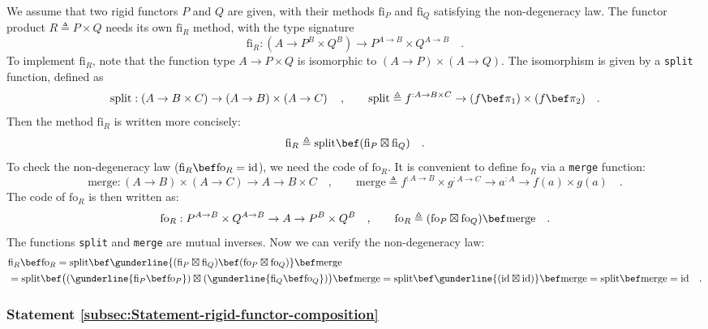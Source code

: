We assume that two rigid functors $P$ and $Q$ are given, with their
methods $\text{fi}_{P}$ and $\text{fi}_{Q}$ satisfying the non-degeneracy
law. The functor product $R\triangleq P\times Q$ needs its own $\text{fi}_{R}$
method, with the type signature
\[
\text{fi}_{R}:(A\rightarrow P^{B}\times Q^{B})\rightarrow P^{A\rightarrow B}\times Q^{A\rightarrow B}\quad.
\]
To implement $\text{fi}_{R}$, note that the function type $A\rightarrow P\times Q$
is isomorphic to $\left(A\rightarrow P\right)\times\left(A\rightarrow Q\right)$.
The isomorphism is given by a \lstinline!split! function, defined
as
\[
\text{split}:\left(A\rightarrow B\times C\right)\rightarrow\left(A\rightarrow B\right)\times\left(A\rightarrow C\right)\quad,\quad\quad\text{split}\triangleq f^{:A\rightarrow B\times C}\rightarrow(f\bef\pi_{1})\times(f\bef\pi_{2})\quad.
\]
Then the method $\text{fi}_{R}$ is written more concisely:
\[
\text{fi}_{R}\triangleq\text{split}\bef(\text{fi}_{P}\boxtimes\text{fi}_{Q})\quad.
\]
To check the non-degeneracy law ($\text{fi}_{R}\bef\text{fo}_{R}=\text{id}$),
we need the code of $\text{fo}_{R}$. It is convenient to define $\text{fo}_{R}$
via a \lstinline!merge! function:
\[
\text{merge}:\left(A\rightarrow B\right)\times\left(A\rightarrow C\right)\rightarrow A\rightarrow B\times C\quad,\quad\quad\text{merge}\triangleq f^{:A\rightarrow B}\times g^{:A\rightarrow C}\rightarrow a^{:A}\rightarrow f(a)\times g(a)\quad.
\]
The code of $\text{fo}_{R}$ is then written as:
\[
\text{fo}_{R}:P^{A\rightarrow B}\times Q^{A\rightarrow B}\rightarrow A\rightarrow P^{B}\times Q^{B}\quad,\quad\quad\text{fo}_{R}\triangleq(\text{fo}_{P}\boxtimes\text{fo}_{Q})\bef\text{merge}\quad.
\]
The functions \lstinline!split! and \lstinline!merge! are mutual
inverses. Now we can verify the non-degeneracy law:
\begin{align*}
 & \text{fi}_{R}\bef\text{fo}_{R}=\text{split}\bef\gunderline{(\text{fi}_{P}\boxtimes\text{fi}_{Q})\bef(\text{fo}_{P}\boxtimes\text{fo}_{Q})}\bef\text{merge}\\
 & =\text{split}\bef\big((\gunderline{\text{fi}_{P}\bef\text{fo}_{P}})\boxtimes(\gunderline{\text{fi}_{Q}\bef\text{fo}_{Q}})\big)\bef\text{merge}=\text{split}\bef\gunderline{(\text{id}\boxtimes\text{id})}\bef\text{merge}=\text{split}\bef\text{merge}=\text{id}\quad.
\end{align*}


\subsubsection{Statement \label{subsec:Statement-rigid-functor-composition}\ref{subsec:Statement-rigid-functor-composition}}

